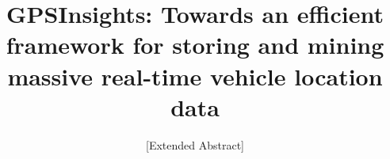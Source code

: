\documentclass{acm_proc_article-sp}
\begin{document}
\title{GPSInsights: Towards an efficient framework for storing and mining massive real-time vehicle location data}

\subtitle{[Extended Abstract]
}
%
%
%
%
%
\end{document}
